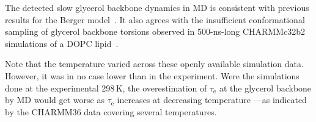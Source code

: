 \documentclass[journal=jpcbfk,manuscript=article,layout=twocolumn]{achemso}
\begin{document}
The detected slow glycerol backbone dynamics in MD is consistent with previous results for the Berger model~\cite{ferreira15}. It also agrees with the  insufficient conformational sampling of glycerol backbone torsions observed in 500-ns-long CHARMMc32b2~\cite{schlenkrich96,feller00} simulations of a DOPC lipid~\cite{vogel12}. %


Note that the temperature varied across these openly available simulation data. However, it was in no case lower than in the experiment. %
Were the simulations done at the experimental 298\,K, the overestimation of $\tau_\mathrm{e}$ at the glycerol backbone by MD would get worse as $\tau_\mathrm{e}$  increases at decreasing temperature
---as indicated by the CHARMM36 data covering several temperatures.
\end{document}
